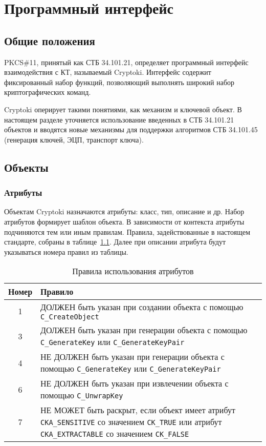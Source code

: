 \chapter{Программный интерфейс}\label{CRYPTOKI}

\section{Общие положения}

PKCS\#11, принятый как СТБ 34.101.21, определяет программный
интерфейс взаимодействия с КТ, называемый Cryptoki.
Интерфейс содержит фиксированный набор функций, позволяющий
выполнять широкий набор криптографических команд.

Cryptoki оперирует такими понятиями, как механизм и ключевой объект.
%
В настоящем разделе уточняется использование введенных
в СТБ 34.101.21 объектов и вводятся новые механизмы для поддержки
алгоритмов СТБ 34.101.45 (генерация ключей, ЭЦП, транспорт ключа).

\section{Объекты}

\subsection{Атрибуты}

Объектам Cryptoki назначаются атрибуты: класс, тип, описание и др. 
%
Набор атрибутов формирует шаблон объекта.
%
В зависимости от контекста атрибуты подчиняются тем или иным правилам.
Правила, задействованные в настоящем стандарте, собраны в
таблице~\ref{Table.CRYPTOKI.AttrUse}. Далее при описании атрибута будут
указываться номера правил из таблицы.

\begin{table}[H]
\caption{Правила использования атрибутов}\label{Table.CRYPTOKI.AttrUse}
\begin{tabular}{|c|p{420pt}|}
\hline
Номер & Правило\\
\hline
\hline
1 & ДОЛЖЕН быть указан при создании объекта с помощью
\verb|C_CreateObject|\\
\hline
3 & ДОЛЖЕН быть указан при генерации объекта с помощью
\verb|C_GenerateKey| или \verb|C_GenerateKeyPair|\\
\hline
4 & НЕ ДОЛЖЕН быть указан при генерации объекта с помощью
\verb|C_GenerateKey| или \verb|C_GenerateKeyPair|\\
\hline
6 & НЕ ДОЛЖЕН быть указан при извлечении объекта с помощью
\verb|C_UnwrapKey|\\
\hline
7 & НЕ МОЖЕТ быть раскрыт, если объект имеет атрибут
\verb|CKA_SENSITIVE| со значением \verb|CK_TRUE| или атрибут
\verb|CKA_EXTRACTABLE| со значением \verb|CK_FALSE|\\
\hline
\end{tabular}
\end{table}

